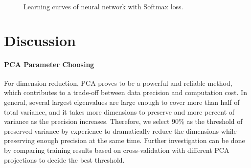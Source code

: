 \documentclass[10pt,twocolumn,letterpaper]{article}
\begin{document}
\begin{figure}[htbp]
	\centering
	\caption{Learning curves of neural network with Softmax loss.}
	\label{fig:dl_softmax}
\end{figure}

\section{Discussion}

	\paragraph{PCA Parameter Choosing} For dimension reduction, PCA proves to be a powerful and reliable method, which contributes to a trade-off between data precision and computation cost. In general, several largest eigenvalues are large enough to cover more than half of total variance, and it takes more dimensions to preserve and more percent of variance as the precision increases. Therefore, we select 90\% as the threshold of preserved variance by experience to dramatically reduce the dimensions while preserving enough precision at the same time. Further investigation can be done by comparing training results based on cross-validation with different PCA projections to decide the best threshold.
	
\end{document}

